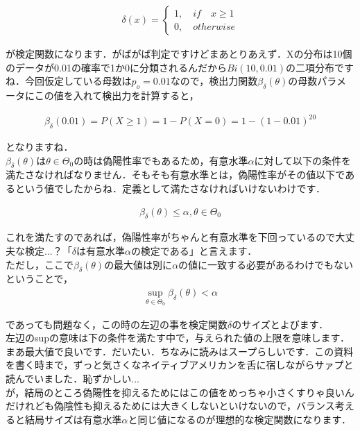 \documentclass[11pt,a4paper,uplatex]{ujreport} 	%
\begin{document}
\begin{align}
  \delta(x) = 
  \left\{
    \begin{array}{l}
    1, \quad if \quad  x \geq 1\\
    0, \quad otherwise
    \end{array}
  \right.
\end{align}

が検定関数になります．がばがば判定ですけどまあとりあえず．Xの分布は10個のデータが0.01の確率で1か0に分類されるんだから$Bi(10,0.01)$の二項分布ですね．今回仮定している母数は$p_o = 0.01$なので，検出力関数$\beta_\delta(\theta)$の母数パラメータにこの値を入れて検出力を計算すると，

\begin{align}
  \beta_\delta(0.01) = P(X \geq 1) = 1-P(X=0) = 1-(1-0.01)^{20}
  \label{eq:size}
\end{align}

となりますね．\\

$\beta_\delta(\theta)$は$\theta \in \Theta_0$の時は偽陽性率でもあるため，有意水準$\alpha$に対して以下の条件を満たさなければなりません．そもそも有意水準とは，偽陽性率がその値以下であるという値でしたからね．定義として満たさなければいけないわけです．

\begin{align}
  \beta_\delta(\theta) \leq \alpha, \theta \in \Theta_0
  \label{eq:power}
\end{align}

これを満たすのであれば，偽陽性率がちゃんと有意水準を下回っているので大丈夫な検定...？「$\delta$は有意水準$\alpha$の検定である」と言えます．\\

ただし，ここで$\beta_\delta(\theta)$の最大値は別に$\alpha$の値に一致する必要があるわけでもないということで，
\begin{align}
\displaystyle \sup_{\theta \in\Theta_0} \beta_\delta(\theta) < \alpha
\end{align}

であっても問題なく，この時の左辺の事を検定関数$\delta$のサイズとよびます．\\

左辺のsupの意味は下の条件を満たす中で，与えられた値の上限を意味します．まあ最大値で良いです．だいたい．ちなみに読みはスープらしいです．この資料を書く時まで，ずっと気さくなネイティブアメリカンを舌に宿しながらサァプと読んでいました．恥ずかしい...\\

が，結局のところ偽陽性を抑えるためにはこの値をめっちゃ小さくすりゃ良いんだけれども偽陰性も抑えるためには大きくしないといけないので，バランス考えると結局サイズは有意水準$\alpha$と同じ値になるのが理想的な検定関数になります．\\
\\
\end{document}

